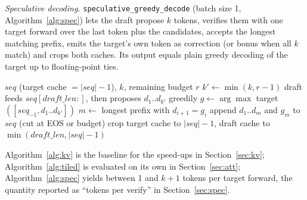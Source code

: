 \documentclass[conference]{IEEEtran}
\newcommand{\code}[1]{\texttt{#1}}
\begin{document}
\emph{Speculative decoding.} \code{speculative\_greedy\_decode} (batch size 1, Algorithm~\ref{alg:spec}) lets the draft propose $k$ tokens, verifies them with one target forward over the last token plus the candidates, accepts the longest matching prefix, emits the target's own token as correction (or bonus when all $k$ match) and crops both caches. Its output equals plain greedy decoding of the target up to floating-point ties. %

\begin{algorithm}[t]
\caption{Greedy speculative decoding (one iteration)}\label{alg:spec}
\small
\begin{algorithmic}[1]
\REQUIRE $seq$ (target cache $=|seq|-1$), $k$, remaining budget $r$
\STATE $k'\leftarrow\min(k,r-1)$
\STATE draft feeds $seq[draft\_len{:}]$, then proposes $d_1..d_{k'}$ greedily
\STATE $g\leftarrow\arg\max$ target$([seq_{-1},d_1..d_{k'}])$ 
\STATE $m\leftarrow$ longest prefix with $d_{i+1}=g_i$
\STATE append $d_1..d_m$ and $g_m$ to $seq$ (cut at EOS or budget)
\STATE crop target cache to $|seq|-1$, draft cache to $\min(draft\_len,|seq|-1)$
\end{algorithmic}
\end{algorithm}

Algorithm~\ref{alg:kv} is the baseline for the speed-ups in Section~\ref{sec:kv}; Algorithm~\ref{alg:tiled} is evaluated on its own in Section~\ref{sec:att}; Algorithm~\ref{alg:spec} yields between 1 and $k+1$ tokens per target forward, the quantity reported as ``tokens per verify'' in Section~\ref{sec:spec}.
\end{document}
